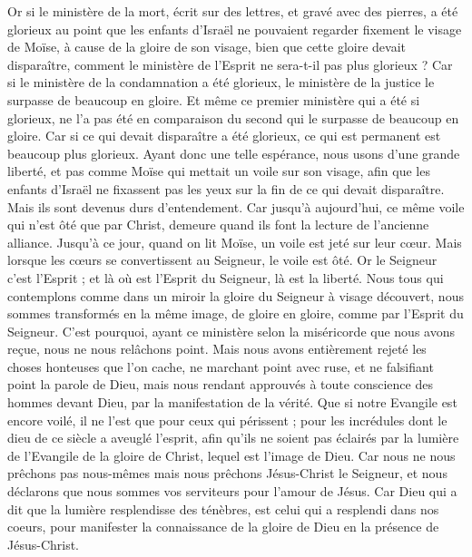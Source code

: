 \begin{multicols}{2}
Or si le ministère de la mort, écrit sur des lettres, et gravé avec des pierres, a été glorieux au point que les enfants d'Israël ne pouvaient regarder fixement le visage de Moïse, à cause de la gloire de son visage, bien que cette gloire devait disparaître,
comment le ministère de l'Esprit ne sera-t-il pas plus glorieux ?
Car si le ministère de la condamnation a été glorieux, le ministère de la justice le surpasse de beaucoup en gloire.
Et même ce premier ministère qui a été si glorieux, ne l'a pas été en comparaison du second qui le surpasse de beaucoup en gloire.
Car si ce qui devait disparaître a été glorieux, ce qui est permanent est beaucoup plus glorieux.
Ayant donc une telle espérance, nous usons d'une grande liberté,
et pas comme Moïse qui mettait un voile sur son visage, afin que les enfants d'Israël ne fixassent pas les yeux sur la fin de ce qui devait disparaître.
Mais ils sont devenus durs d’entendement. Car jusqu'à aujourd'hui, ce même voile qui n’est ôté que par Christ, demeure quand ils font la lecture de l'ancienne alliance.
Jusqu'à ce jour, quand on lit Moïse, un voile est jeté sur leur cœur.
Mais lorsque les cœurs se convertissent au Seigneur, le voile est ôté.
Or le Seigneur c'est l'Esprit ; et là où est l'Esprit du Seigneur, là est la liberté.
Nous tous qui contemplons comme dans un miroir la gloire du Seigneur à visage découvert, nous sommes transformés en la même image, de gloire en gloire, comme par l'Esprit du Seigneur.
\VerseOne{}C'est pourquoi, ayant ce ministère selon la miséricorde que nous avons reçue, nous ne nous relâchons point.
Mais nous avons entièrement rejeté les choses honteuses que l'on cache, ne marchant point avec ruse, et ne falsifiant point la parole de Dieu, mais nous rendant approuvés à toute conscience des hommes devant Dieu, par la manifestation de la vérité.
Que si notre Evangile est encore voilé, il ne l'est que pour ceux qui périssent ;
pour les incrédules dont le dieu de ce siècle a aveuglé l’esprit, afin qu’ils ne soient pas éclairés par la lumière de l'Evangile de la gloire de Christ, lequel est l'image de Dieu.
Car nous ne nous prêchons pas nous-mêmes mais nous prêchons Jésus-Christ le Seigneur, et nous déclarons que nous sommes vos serviteurs pour l'amour de Jésus.
Car Dieu qui a dit que la lumière resplendisse des ténèbres, est celui qui a resplendi dans nos coeurs, pour manifester la connaissance de la gloire de Dieu en la présence de Jésus-Christ.

\end{multicols}
